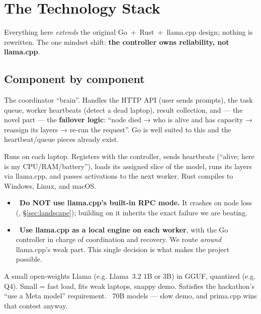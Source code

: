 \section{The Technology Stack}
\label{sec:techstack}

Everything here \emph{extends} the original Go~+~Rust~+~llama.cpp design; nothing
is rewritten. The one mindset shift: \textbf{the controller owns reliability,
not llama.cpp}.

\subsection{Component by component}

 The coordinator ``brain''. Handles the HTTP API
(user sends prompts), the task queue, worker heartbeats (detect a dead laptop),
result collection, and --- the novel part --- the \textbf{failover logic}:
``node died → who is alive and has capacity → reassign its layers → re-run the
request''. Go is well suited to this and the heartbeat/queue pieces already exist.

 Runs on each laptop. Registers with the
controller, sends heartbeats (``alive; here is my CPU/RAM/battery''), loads its
assigned slice of the model, runs its layers via llama.cpp, and passes
activations to the next worker. Rust compiles to Windows, Linux, and macOS.

\begin{itemize}[leftmargin=1.4em,nosep]
  \item \Drop\ \textbf{Do NOT use llama.cpp's built-in RPC mode.} It crashes on
  node loss (\VER, \S\ref{sec:landscape}); building on it inherits the exact
  failure we are beating.
  \item \Keep\ \textbf{Use llama.cpp as a local engine on each worker}, with the
  Go controller in charge of coordination and recovery. We route \emph{around}
  llama.cpp's weak part. This single decision is what makes the project possible.
\end{itemize}

 A small open-weights Llama (e.g.
Llama~3.2 1B or 3B) in GGUF, quantized (e.g. Q4). Small = fast load, fits weak
laptops, snappy demo. Satisfies the hackathon's ``use a Meta model'' requirement.
\Drop\ 70B models --- slow demo, and prima.cpp wins that contest anyway.

